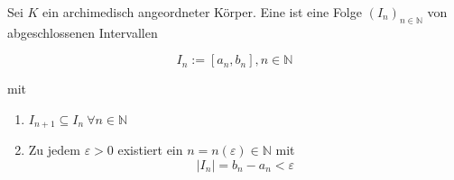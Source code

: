 Sei $K$ ein archimedisch angeordneter Körper. Eine  ist eine Folge $(I_n)_{n \in \mathbb{N}}$ von abgeschlossenen Intervallen

$$I_n := [a_n, b_n], n \in \mathbb{N}$$

mit

\begin{enumerate}

    \item $I_{n+1} \subseteq I_n \ \forall n \in \mathbb{N}$

    \item Zu jedem $\varepsilon > 0$ existiert ein $n = n(\varepsilon) \in \mathbb{N}$ mit
    $$|I_n| = b_n - a_n < \varepsilon$$
    
\end{enumerate}